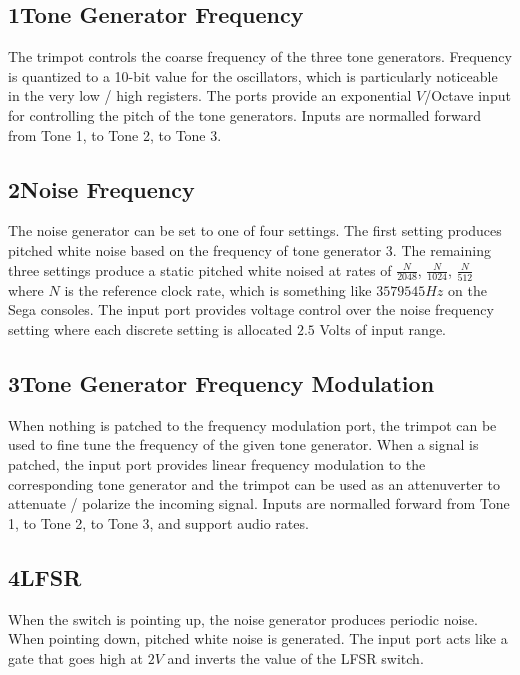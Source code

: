 \documentclass[12pt,letter]{article}
\begin{document}
\subsection*{1{\quad}Tone Generator Frequency}

The trimpot controls the coarse frequency of the three tone generators. Frequency is quantized to a 10-bit value for the oscillators, which is particularly noticeable in the very low / high registers. The ports provide an exponential $V$/Octave input for controlling the pitch of the tone generators. Inputs are normalled forward from Tone 1, to Tone 2, to Tone 3.

\subsection*{2{\quad}Noise Frequency}

The noise generator can be set to one of four settings. The first setting produces pitched white noise based on the frequency of tone generator 3. The remaining three settings produce a static pitched white noised at rates of $\frac{N}{2048}$, $\frac{N}{1024}$, $\frac{N}{512}$ where $N$ is the reference clock rate, which is something like $3579545Hz$ on the Sega consoles. The input port provides voltage control over the noise frequency setting where each discrete setting is allocated $2.5$ Volts of input range.

\clearpage
\subsection*{3{\quad}Tone Generator Frequency Modulation}

When nothing is patched to the frequency modulation port, the trimpot can be used to fine tune the frequency of the given tone generator. When a signal is patched, the input port provides linear frequency modulation to the corresponding tone generator and the trimpot can be used as an attenuverter to attenuate / polarize the incoming signal. Inputs are normalled forward from Tone 1, to Tone 2, to Tone 3, and support audio rates.

\subsection*{4{\quad}LFSR}

When the switch is pointing up, the noise generator produces periodic noise. When pointing down, pitched white noise is generated. The input port acts like a gate that goes high at $2V$ and inverts the value of the LFSR switch.
\end{document}

